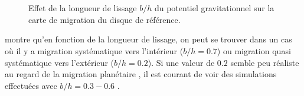 \begin{figure}[htbp]
\centering
{}\hfill
{}\\
\hfill
{}\\
\caption{Effet de la longueur de lissage $b/h$ du potentiel gravitationnel sur la carte de migration du disque de référence.
}\label{fig:migration_map_smoothing}
\end{figure}

 montre qu'en fonction de la longueur de lissage, on peut se trouver dans un cas où il y a
migration systématique vers l'intérieur ($b/h=0.7$) ou migration quasi systématique vers l'extérieur ($b/h=0.2$). Si une valeur
de $0.2$ semble peu réaliste au regard de la migration planétaire \citep{muller2012treating}, il est courant de voir des
simulations effectuées avec $b/h=0.3-0.6$ \citep{masset2002coorbital, devalborro2006comparative, paardekooper2009corotation}. 

